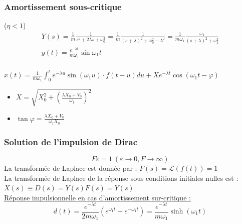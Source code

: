 \documentclass[../main.tex]{subfiles}
\begin{document}
\subsubsection{Amortissement sous-critique}
($\eta < 1$)\\

\begin{equation}
    \begin{gathered}
        Y(s) = \frac{1}{m} \frac{1}{s^2 + 2\lambda s+ \omega_0^2} = \frac{1}{m} \frac{1}{(s+\lambda)^2 + \omega_0^2-\lambda^2} = \frac{1}{m\omega_1} \frac{\omega_1}{(s+\lambda)^2+\omega_1^2}\\
        y(t) = \frac{e^{-\lambda t}}{m\omega_1} \sin{\omega_1 t}\\
    \end{gathered}
\end{equation}

$x(t) = \frac{1}{m\omega_1} \int_0^t e^{-\lambda u} \sin{(\omega_1u)}\cdot f(t-u)du + X e^{-\lambda t}\cos{(\omega_1t-\varphi)}$\\
\begin{itemize}
    \item $X = \sqrt{X_0^2 + (\frac{\lambda X_0 + V_0}{\omega_1})^2}$\\
    \item $\tan \varphi = \frac{\lambda X_0 + V_0}{\omega_1 X_0}$\\
\end{itemize}

\subsubsection{Solution de l'impulsion de Dirac}
\begin{equation}
    F\varepsilon = 1 \: (\varepsilon \rightarrow 0, F\rightarrow \infty)
\end{equation}
La transformée de Laplace est donnée par : $F(s) = \mathcal{L}(f(t))=1$\\

La transformée de Laplace de la réponse sous conditions initiales nulles est : $X(s) \equiv D(s) = Y(s)F(s) = Y(s)$\\

\quad \underline{Réponse impulsionnelle en cas d'amortissement sur-critique :}\\
\begin{equation}
    d(t) = \frac{e^{-\lambda t}}{2m\omega_1} (e^{\omega_1 t} - e^{-\omega_1 t}) = \frac{e^{-\lambda t}}{m\omega_1}\sinh(\omega_1 t)
\end{equation}
\end{document}
